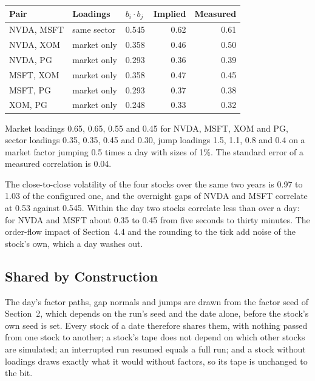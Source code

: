 \documentclass[11pt,a4paper]{article}
\theoremstyle{paper}
\begin{document}
\begin{center}
\small
\begin{tabular}{@{}lllrr@{}}
\toprule
\textbf{Pair} & \textbf{Loadings} & $b_i\cdot b_j$ & \textbf{Implied} & \textbf{Measured}\\
\midrule
NVDA, MSFT & same sector & 0.545 & 0.62 & 0.61\\
NVDA, XOM & market only & 0.358 & 0.46 & 0.50\\
NVDA, PG & market only & 0.293 & 0.36 & 0.39\\
MSFT, XOM & market only & 0.358 & 0.47 & 0.45\\
MSFT, PG & market only & 0.293 & 0.37 & 0.38\\
XOM, PG & market only & 0.248 & 0.33 & 0.32\\
\bottomrule
\end{tabular}

\smallskip
{\footnotesize Market loadings 0.65, 0.65, 0.55 and 0.45 for NVDA, MSFT, XOM and PG, sector loadings 0.35, 0.35, 0.45 and 0.30, jump loadings 1.5, 1.1, 0.8 and 0.4 on a market factor jumping 0.5 times a day with sizes of 1\%. The standard error of a measured correlation is 0.04.}
\end{center}

The close-to-close volatility of the four stocks over the same two years is 0.97 to 1.03 of the configured one, and the overnight gaps of NVDA and MSFT correlate at 0.53 against 0.545. Within the day two stocks correlate less than over a day: for NVDA and MSFT about 0.35 to 0.45 from five seconds to thirty minutes. The order-flow impact of Section~4.4 and the rounding to the tick add noise of the stock's own, which a day washes out.

\subsection{Shared by Construction}

The day's factor paths, gap normals and jumps are drawn from the factor seed of Section~2, which depends on the run's seed and the date alone, before the stock's own seed is set. Every stock of a date therefore shares them, with nothing passed from one stock to another; a stock's tape does not depend on which other stocks are simulated; an interrupted run resumed equals a full run; and a stock without loadings draws exactly what it would without factors, so its tape is unchanged to the bit.

\end{document}
